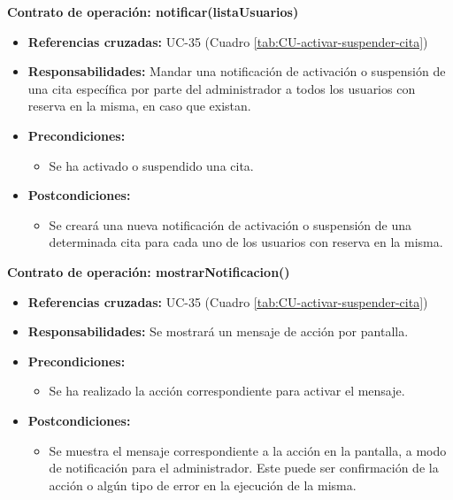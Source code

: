 \textbf{Contrato de operación: notificar(listaUsuarios)}
\begin{itemize}
\item \textbf{Referencias cruzadas:} UC-35 (Cuadro \ref{tab:CU-activar-suspender-cita})
\item \textbf{Responsabilidades:} Mandar una notificación de activación o suspensión de una cita específica por parte del administrador a todos los usuarios con reserva en la misma, en caso que existan.
\item \textbf{Precondiciones:} 
 \begin{itemize}
\item Se ha activado o suspendido una cita.
\end {itemize}
\item \textbf{Postcondiciones:} 
 \begin{itemize}
\item Se creará una nueva notificación de activación o suspensión de una determinada cita para cada uno de los usuarios con reserva en la misma.
\end {itemize}
\end {itemize}

\textbf{Contrato de operación: mostrarNotificacion()}
\begin{itemize}
\item \textbf{Referencias cruzadas:} UC-35 (Cuadro \ref{tab:CU-activar-suspender-cita})
\item \textbf{Responsabilidades:} Se mostrará un mensaje de acción por pantalla.
\item \textbf{Precondiciones:} 
 \begin{itemize}
\item Se ha realizado la acción correspondiente para activar el mensaje.
\end {itemize}
\item \textbf{Postcondiciones:} 
 \begin{itemize}
\item Se muestra el mensaje correspondiente a la acción en la pantalla, a modo de notificación para el administrador. Este puede ser confirmación de la acción o algún tipo de error en la ejecución de la misma.
\end {itemize}
\end {itemize}


\vspace{7mm}
\dotfill
\vspace{7mm}

